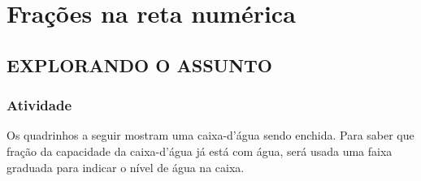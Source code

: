 		  
		  
		  
		  
		  
		  
\mbox{}
\thispagestyle{empty}
\newpage

\setcounter{chapter}{2}
\chapter{Frações na reta numérica }
\setcounter{subsection}{0}
\section{EXPLORANDO O ASSUNTO }

\subsection{Atividade}

Os quadrinhos a seguir mostram uma caixa-d'água sendo enchida. 
Para saber que fração da capacidade da caixa-d'água já está com água, será usada uma faixa graduada para indicar o nível de água na caixa. 


